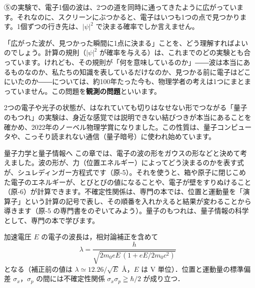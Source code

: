 \begin{phmada}
\label{ph:原-3:sec11}
⑤の実験で、電子1個の波は、2つの道を同時に通ってきたように広がっています。それなのに、スクリーンにぶつかると、電子はいつも1つの点で見つかります。1個ずつの行き先は、$|\psi|^2$ で決まる確率でしか言えません。

「広がった波が、見つかった瞬間に1点に決まる」ことを、どう理解すればよいのでしょう。計算の規則（$|\psi|^2$ が確率を与える）は、これまでのどの実験とも合っています。けれども、その規則が「何を意味しているのか」――波は本当にあるものなのか、私たちの知識を表しているだけなのか、見つかる前に電子はどこにいたのか――については、約100年たった今も、物理学者の考えは1つにまとまっていません。この問題を\textbf{観測の問題}といいます。

2つの電子や光子の状態が、はなれていても切りはなせない形でつながる「量子のもつれ」の実験は、身近な感覚では説明できない結びつきが本当にあることを確かめ、2022年のノーベル物理学賞になりました。この性質は、量子コンピュータや、こっそり読まれない通信（量子暗号）に使われ始めています。
\end{phmada}

\begin{phsaki}{量子力学と量子情報へ}
この章では、電子の波の形をガウスの形などと決めて考えました。波の形が、力（位置エネルギー）によってどう決まるのかを表す式が、シュレディンガー方程式です（原-5）。それを使うと、箱や原子に閉じこめた電子のエネルギーが、とびとびの値になることや、電子が壁をすりぬけること（原-6）が計算できます。不確定性関係は、専門の本では、位置と運動量を「演算子」という計算の記号で表し、その順番を入れかえると結果が変わることから導きます（原-5 の専門書をのぞいてみよう）。量子のもつれは、量子情報の科学として、専門の本で学びます。
\end{phsaki}

\begin{senmonsho}
\begin{bkhonbun}
加速電圧 $E$ の電子の波長は，相対論補正を含めて
\[ \lambda=\frac{h}{\sqrt{2m_0eE\,(1+eE/2m_0c^2)}} \]
となる（補正前の値は $\lambda\simeq12.26/\sqrt{E}$ Å，$E$ は V 単位）．位置と運動量の標準偏差 $\sigma_x$，$\sigma_p$ の間には不確定性関係 $\sigma_x\sigma_p\geqq\hbar/2$ が成り立つ．
\end{bkhonbun}
\end{senmonsho}

